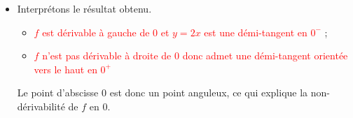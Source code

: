 \documentclass[12pt,a4paper]{article}
\begin{document}
\begin{enumerate}
\begin{enumerate}
\begin{itemize}
\begin{itemize}
    \begin{resultbox}
    \[
    \mathbf{ \lim\limits_{x \to 0^+} \dfrac{f(x)-f(0)}{x} = 0 \text{ et } \lim\limits_{x \to 0^+} \dfrac{f(x)-f(0)}{x} = +\infty }
    \]
   \end{resultbox} 

\end{itemize}  
\item Interprétons le résultat obtenu.

\begin{itemize}
\item \textcolor{red}{ $f$ est dérivable à gauche de $0$ et $y=2x$ est une démi-tangent en $0^-$ } ;
\item \textcolor{red}{ $f$ n'est pas dérivable à droite de $0$ donc admet une démi-tangent orientée vers le haut en $0^+$  }
\end{itemize}
Le point d’abscisse $0$ est donc un point anguleux, ce qui explique la non-dérivabilité de $f$ en $0$.
\end{itemize}        

\end{enumerate}
\end{enumerate}
\end{document}
